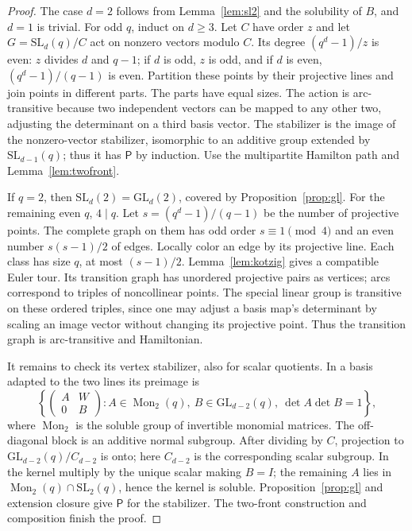 \documentclass[11pt]{article}
\theoremstyle{definition}
\newcommand{\Pp}{\mathsf P}
\newcommand{\GL}{\mathrm{GL}}
\newcommand{\SL}{\mathrm{SL}}
\begin{document}
\begin{proof}
The case $d=2$ follows from Lemma~\ref{lem:sl2} and the solubility of $B$, and $d=1$ is trivial. For odd $q$, induct on $d\ge3$. Let $C$ have order $z$ and let $G=\SL_d(q)/C$ act on nonzero vectors modulo $C$. Its degree $(q^d-1)/z$ is even: $z$ divides $d$ and $q-1$; if $d$ is odd, $z$ is odd, and if $d$ is even, $(q^d-1)/(q-1)$ is even. Partition these points by their projective lines and join points in different parts. The parts have equal sizes. The action is arc-transitive because two independent vectors can be mapped to any other two, adjusting the determinant on a third basis vector. The stabilizer is the image of the nonzero-vector stabilizer, isomorphic to an additive group extended by $\SL_{d-1}(q)$; thus it has $\Pp$ by induction. Use the multipartite Hamilton path and Lemma~\ref{lem:twofront}.

If $q=2$, then $\SL_d(2)=\GL_d(2)$, covered by Proposition~\ref{prop:gl}. For the remaining even $q$, $4\mid q$. Let $s=(q^d-1)/(q-1)$ be the number of projective points. The complete graph on them has odd order $s\equiv1\pmod4$ and an even number $s(s-1)/2$ of edges. Locally color an edge by its projective line. Each class has size $q$, at most $(s-1)/2$. Lemma~\ref{lem:kotzig} gives a compatible Euler tour. Its transition graph has unordered projective pairs as vertices; arcs correspond to triples of noncollinear points. The special linear group is transitive on these ordered triples, since one may adjust a basis map's determinant by scaling an image vector without changing its projective point. Thus the transition graph is arc-transitive and Hamiltonian.

It remains to check its vertex stabilizer, also for scalar quotients. In a basis adapted to the two lines its preimage is
\[
\left\{\begin{pmatrix}A&W\\0&B\end{pmatrix}:
A\in\operatorname{Mon}_2(q),\ B\in\GL_{d-2}(q),\ \det A\det B=1\right\},
\]
where $\operatorname{Mon}_2$ is the soluble group of invertible monomial matrices. The off-diagonal block is an additive normal subgroup. After dividing by $C$, projection to $\GL_{d-2}(q)/C_{d-2}$ is onto; here $C_{d-2}$ is the corresponding scalar subgroup. In the kernel multiply by the unique scalar making $B=I$; the remaining $A$ lies in $\operatorname{Mon}_2(q)\cap\SL_2(q)$, hence the kernel is soluble. Proposition~\ref{prop:gl} and extension closure give $\Pp$ for the stabilizer. The two-front construction and composition finish the proof.
\end{proof}
\end{document}
